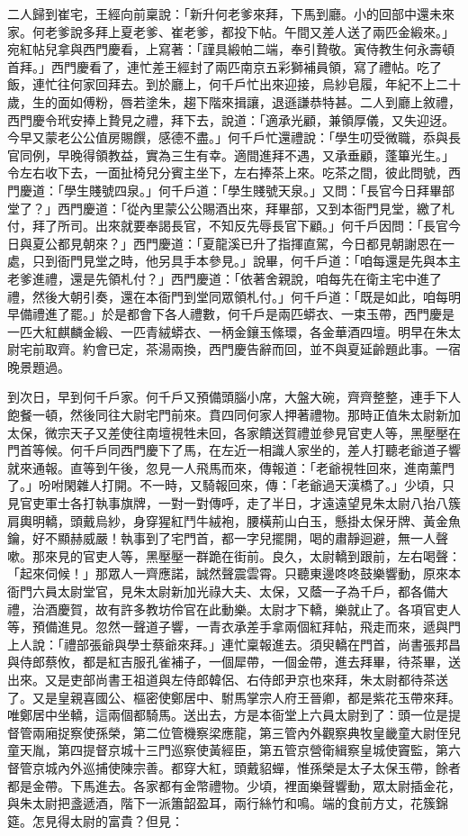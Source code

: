 二人歸到崔宅，王經向前稟說：「新升何老爹來拜，下馬到廳。小的回部中還未來家。何老爹說多拜上夏老爹、崔老爹，都投下帖。午間又差人送了兩匹金緞來。」 宛紅帖兒拿與西門慶看，上寫著：「謹具緞帕二端，奉引贄敬。寅侍教生何永壽頓首拜。」西門慶看了，連忙差王經封了兩匹南京五彩獅補員領，寫了禮帖。吃了飯，連忙往何家回拜去。到於廳上，何千戶忙出來迎接，烏紗皂履，年紀不上二十歲，生的面如傅粉，唇若塗朱，趨下階來揖讓，退遜謙恭特甚。二人到廳上敘禮，西門慶令玳安捧上贄見之禮，拜下去，說道：「適承光顧，兼領厚儀，又失迎迓。今早又蒙老公公值房賜饌，感德不盡。」何千戶忙還禮說：「學生叨受微職，忝與長官同例，早晚得領教益，實為三生有幸。適間進拜不遇，又承垂顧，蓬篳光生。」令左右收下去，一面扯椅兒分賓主坐下，左右捧茶上來。吃茶之間，彼此問號，西門慶道：「學生賤號四泉。」何千戶道：「學生賤號天泉。」又問：「長官今日拜畢部堂了？」西門慶道：「從內里蒙公公賜酒出來，拜畢部，又到本衙門見堂，繳了札付，拜了所司。出來就要奉謁長官，不知反先辱長官下顧。」何千戶因問：「長官今日與夏公都見朝來？」西門慶道：「夏龍溪已升了指揮直駕，今日都見朝謝恩在一處，只到衙門見堂之時，他另具手本參見。」說畢，何千戶道：「咱每還是先與本主老爹進禮，還是先領札付？」西門慶道：「依著舍親說，咱每先在衛主宅中進了禮，然後大朝引奏，還在本衙門到堂同眾領札付。」何千戶道：「既是如此，咱每明早備禮進了罷。」於是都會下各人禮數，何千戶是兩匹蟒衣、一束玉帶，西門慶是一匹大紅麒麟金緞、一匹青絨蟒衣、一柄金鑲玉絛環，各金華酒四壇。明早在朱太尉宅前取齊。約會已定，茶湯兩換，西門慶告辭而回，並不與夏延齡題此事。一宿晚景題過。

到次日，早到何千戶家。何千戶又預備頭腦小席，大盤大碗，齊齊整整，連手下人飽餐一頓，然後同往大尉宅門前來。賁四同何家人押著禮物。那時正值朱太尉新加太保，微宗天子又差使往南壇視牲未回，各家饋送賀禮並參見官吏人等，黑壓壓在門首等候。何千戶同西門慶下了馬，在左近一相識人家坐的，差人打聽老爺道子響就來通報。直等到午後，忽見一人飛馬而來，傳報道：「老爺視牲回來，進南薰門了。」吩咐閑雜人打開。不一時，又騎報回來，傳：「老爺過天漢橋了。」少頃，只見官吏軍士各打執事旗牌，一對一對傳呼，走了半日，才遠遠望見朱太尉八抬八簇肩輿明轎，頭戴烏紗，身穿猩紅鬥牛絨袍，腰橫荊山白玉，懸掛太保牙牌、黃金魚鑰，好不顯赫威嚴！執事到了宅門首，都一字兒擺開，喝的肅靜迴避，無一人聲嗽。那來見的官吏人等，黑壓壓一群跪在街前。良久，太尉轎到跟前，左右喝聲： 「起來伺候！」那眾人一齊應諾，誠然聲震雲霄。只聽東邊咚咚鼓樂響動，原來本衙門六員太尉堂官，見朱太尉新加光祿大夫、太保，又蔭一子為千戶，都各備大禮，治酒慶賀，故有許多教坊伶官在此動樂。太尉才下轎，樂就止了。各項官吏人等，預備進見。忽然一聲道子響，一青衣承差手拿兩個紅拜帖，飛走而來，遞與門上人說：「禮部張爺與學士蔡爺來拜。」連忙稟報進去。須臾轎在門首，尚書張邦昌與侍郎蔡攸，都是紅吉服孔雀補子，一個犀帶，一個金帶，進去拜畢，待茶畢，送出來。又是吏部尚書王祖道與左侍郎韓侶、右侍郎尹京也來拜，朱太尉都待茶送了。又是皇親喜國公、樞密使鄭居中、駙馬掌宗人府王晉卿，都是紫花玉帶來拜。唯鄭居中坐轎，這兩個都騎馬。送出去，方是本衙堂上六員太尉到了：頭一位是提督管兩廂捉察使孫榮，第二位管機察梁應龍，第三管內外觀察典牧皇畿童大尉侄兒童天胤，第四提督京城十三門巡察使黃經臣，第五管京營衛緝察皇城使竇監，第六督管京城內外巡捕使陳宗善。都穿大紅，頭戴貂蟬，惟孫榮是太子太保玉帶，餘者都是金帶。下馬進去。各家都有金幣禮物。少頃，裡面樂聲響動，眾太尉插金花，與朱太尉把盞遞酒，階下一派簫韶盈耳，兩行絲竹和鳴。端的食前方丈，花簇錦筵。怎見得太尉的富貴？但見：

